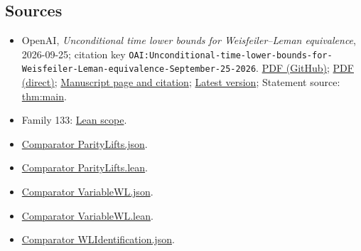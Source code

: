 \documentclass[11pt]{article}
\begin{document}
\subsection{Sources}
\begin{itemize}
\item OpenAI, \emph{Unconditional time lower bounds for Weisfeiler–Leman equivalence}, 2026-09-25; citation key \texttt{OAI:Unconditional-time-lower-bounds-for-Weisfeiler-Leman-equivalence-September-25-2026}. \href{https://github.com/openai/math/blob/adc7f1241b42e322a6451854ab7e4b4c146bf78a/preprints/Unconditional-time-lower-bounds-for-Weisfeiler-Leman-equivalence-September-25-2026/paper.pdf}{PDF (GitHub)}; \href{https://github.com/openai/math/raw/adc7f1241b42e322a6451854ab7e4b4c146bf78a/preprints/Unconditional-time-lower-bounds-for-Weisfeiler-Leman-equivalence-September-25-2026/paper.pdf}{PDF (direct)}; \href{https://github.com/openai/math/blob/adc7f1241b42e322a6451854ab7e4b4c146bf78a/preprints/Unconditional-time-lower-bounds-for-Weisfeiler-Leman-equivalence-September-25-2026/README.md}{Manuscript page and citation}; \href{https://github.com/openai/math/blob/main/preprints/Unconditional-time-lower-bounds-for-Weisfeiler-Leman-equivalence-September-25-2026/paper.pdf}{Latest version}; Statement source: \href{https://github.com/openai/math/blob/adc7f1241b42e322a6451854ab7e4b4c146bf78a/preprints/Unconditional-time-lower-bounds-for-Weisfeiler-Leman-equivalence-September-25-2026/build/main.tex\#L82}{thm:main}.
\item Family 133: \href{https://github.com/openai/math/blob/adc7f1241b42e322a6451854ab7e4b4c146bf78a/lean/docs/133.md}{Lean scope}.
\item \href{https://github.com/openai/math/blob/adc7f1241b42e322a6451854ab7e4b4c146bf78a/lean/ComparatorChallenges/ParityLifts.json}{Comparator ParityLifts.json}.
\item \href{https://github.com/openai/math/blob/adc7f1241b42e322a6451854ab7e4b4c146bf78a/lean/ComparatorChallenges/ParityLifts.lean}{Comparator ParityLifts.lean}.
\item \href{https://github.com/openai/math/blob/adc7f1241b42e322a6451854ab7e4b4c146bf78a/lean/ComparatorChallenges/VariableWL.json}{Comparator VariableWL.json}.
\item \href{https://github.com/openai/math/blob/adc7f1241b42e322a6451854ab7e4b4c146bf78a/lean/ComparatorChallenges/VariableWL.lean}{Comparator VariableWL.lean}.
\item \href{https://github.com/openai/math/blob/adc7f1241b42e322a6451854ab7e4b4c146bf78a/lean/ComparatorChallenges/WLIdentification.json}{Comparator WLIdentification.json}.

\end{itemize}
\end{document}
